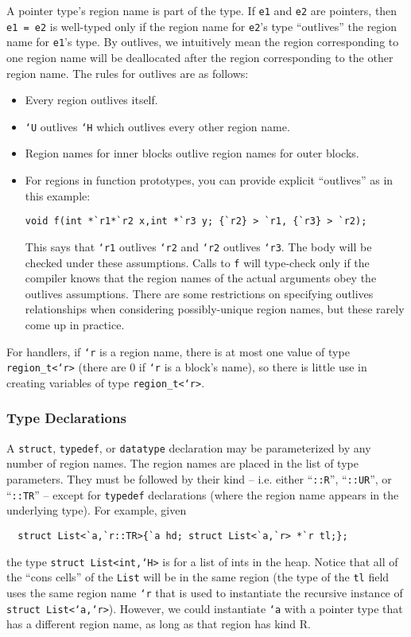 A pointer type's region name is part of the type.  If \texttt{e1} and
\texttt{e2} are pointers, then \texttt{e1 = e2} is well-typed only if
the region name for \texttt{e2}'s type ``outlives'' the region name
for \texttt{e1}'s type.  By outlives, we intuitively mean the region
corresponding to one region name will be deallocated after the region
corresponding to the other region name.  The rules for outlives are as
follows:
\begin{itemize}
\item Every region outlives itself.
\item \texttt{`U} outlives \texttt{`H} which outlives every other region
name.
\item Region names for inner blocks outlive region names for outer
blocks.
\item For regions in function prototypes, you can provide explicit
``outlives'' as in this example:
\begin{verbatim}
void f(int *`r1*`r2 x,int *`r3 y; {`r2} > `r1, {`r3} > `r2);
\end{verbatim}
This says that \texttt{`r1} outlives \texttt{`r2} and \texttt{`r2}
outlives \texttt{`r3}.  The body will be checked under these
assumptions.  Calls to \texttt{f} will type-check only if the compiler
knows that the region names of the actual arguments obey the outlives
assumptions.  There are some restrictions on specifying outlives
relationships when considering possibly-unique region names, but these
rarely come up in practice.
\end{itemize}

For handlers, if \texttt{`r} is a region name, there is at most one
value of type \texttt{region_t<`r>} (there are 0 if \texttt{`r} is a
block's name), so there is little use in creating variables of type
\texttt{region_t<`r>}.

\subsubsection{Type Declarations}

A \texttt{struct}, \texttt{typedef}, or \texttt{datatype}
declaration may be parameterized by any number of region names.  The region
names are placed in the list of type parameters.  They must be followed by
their kind -- i.e. either ``\texttt{::R}'', ``\texttt{::UR}'', or
``\texttt{::TR}'' -- except for \texttt{typedef} declarations (where the
region name appears in the underlying type).  For example, given
\begin{verbatim}
  struct List<`a,`r::TR>{`a hd; struct List<`a,`r> *`r tl;};
\end{verbatim}
the type \texttt{struct List<int,`H>} is for a list of ints in the heap.
Notice that all of the ``cons cells'' of the \texttt{List} will be in
the same region (the type of the \texttt{tl} field uses the same
region name \texttt{`r} that is used to instantiate the recursive
instance of \texttt{struct List<`a,`r>}).  However, we could instantiate
\texttt{`a} with a pointer type that has a different region name, as long as
that region has kind R.

